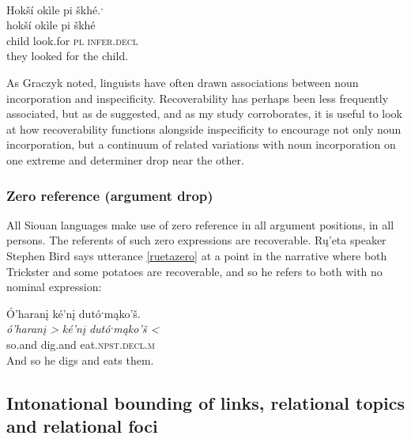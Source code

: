 \documentclass[output=paper]{LSP/langsci}
\begin{document}
\ea\label{deloriachild}
 	Hokší okìle pi škhé.\footnotemark\textsuperscript{,} \footnotemark\\
\gll	hokší		okìle		pi			škhé\\
	child		look.for	\textsc{pl}		\textsc{infer.decl}\\
\glt	they looked for the child. 
\z

	As Graczyk noted, linguists have often drawn associations between noun incorporation and inspecificity. Recoverability has perhaps been less frequently associated, but as de \citet{Reuse1994} suggested, and as my study corroborates, it is useful to look at how recoverability functions alongside inspecificity to encourage not only noun incorporation, but a continuum of related variations with noun incorporation on one extreme and determiner drop near the other.
	
\subsubsection{Zero reference (argument drop)}\label{zeroreference}

	All Siouan languages make use of zero reference in all argument positions, in all persons. The referents of such zero expressions are recoverable. Rų’eta speaker Stephen Bird says utterance \ref{ruetazero} at a point in the narrative where both Trickster and some potatoes are recoverable, and so he refers to both with no nominal expression:
	
\ea\label{ruetazero}
 	Ó’haranį ké’nį dutóˑmąko’š.\footnotemark\\
\gll 	\emph{ó’haranį >}	\emph{ké’nį}		\emph{dutóˑmąko’š <}\\
	so.and		dig.and		eat.\textsc{npst.decl.m}\\
\glt	And so he digs and eats them.
\z

\subsection{Intonational bounding of links, relational topics and relational foci}\label{intonationalbounding}
	
\end{document}

